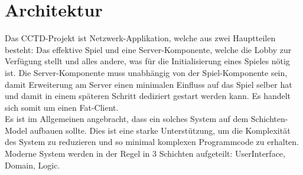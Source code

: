\section{Architektur}

Das CCTD-Projekt ist Netzwerk-Applikation, welche aus zwei Hauptteilen besteht: Das effektive Spiel und eine Server-Komponente, welche die Lobby zur Verfügung stellt und alles andere, was für die Initialisierung eines Spieles nötig ist. Die Server-Komponente muss unabhängig von der Spiel-Komponente sein, damit Erweiterung am Server einen minimalen Einfluss auf das Spiel selber hat und damit in einem späteren Schritt dediziert gestart werden kann. Es handelt sich somit um einen Fat-Client. \\
Es ist im Allgemeinen angebracht, dass ein solches System auf dem Schichten-Model aufbauen sollte. Dies ist eine starke Unterstützung, um die Komplexität des System zu reduzieren und so minimal komplexen Programmcode zu erhalten. Moderne System werden in der Regel in 3 Schichten aufgeteilt: UserInterface, Domain, Logic.

